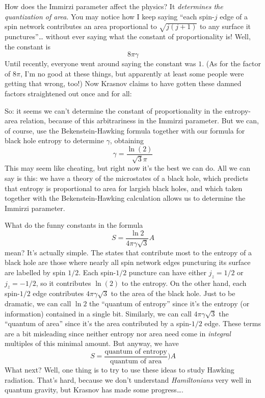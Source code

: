 \documentclass{article}
\def\tightlist{}
\renewcommand{\texttt}[1]{%
  \begingroup
  \ttfamily
  \begingroup\lccode`~=`/\lowercase{\endgroup\def~}{/\discretionary{}{}{}}%
  \begingroup\lccode`~=`[\lowercase{\endgroup\def~}{[\discretionary{}{}{}}%
  \begingroup\lccode`~=`.\lowercase{\endgroup\def~}{.\discretionary{}{}{}}%
  \catcode`/=\active\catcode`[=\active\catcode`.=\active
  \scantokens{#1\noexpand}%
  \endgroup
}
\begin{document}
How does the Immirzi parameter affect the physics? It \emph{determines
the quantization of area}. You may notice how I keep saying ``each
spin-\(j\) edge of a spin network contributes an area proportional to
\(\sqrt{j(j+1)}\) to any surface it punctures''\ldots{} without ever
saying what the constant of proportionality is! Well, the constant is
\[8 \pi \gamma\] Until recently, everyone went around saying the
constant was \(1\). (As for the factor of \(8\pi\), I'm no good at these
things, but apparently at least some people were getting that wrong,
too!) Now Krasnov claims to have gotten these damned factors
straightened out once and for all:


So: it seems we can't determine the constant of proportionality in the
entropy-area relation, because of this arbitrariness in the Immirzi
parameter. But we can, of course, use the Bekenstein-Hawking formula
together with our formula for black hole entropy to determine
\(\gamma\), obtaining \[\gamma = \frac{\ln(2)}{\sqrt{3}\pi}\] This may
seem like cheating, but right now it's the best we can do. All we can
say is this: we have a theory of the microstates of a black hole, which
predicts that entropy is proportional to area for largish black holes,
and which taken together with the Bekenstein-Hawking calculation allows
us to determine the Immirzi parameter.

What do the funny constants in the formula
\[S = \frac{\ln 2}{4\pi\gamma\sqrt{3}} A\] mean? It's actually simple.
The states that contribute most to the entropy of a black hole are those
where nearly all spin network edges puncturing its surface are labelled
by spin \(1/2\). Each spin-\(1/2\) puncture can have either
\(j_z = 1/2\) or \(j_z = -1/2\), so it contributes \(\ln(2)\) to the
entropy. On the other hand, each spin-\(1/2\) edge contributes
\(4\pi\gamma\sqrt{3}\) to the area of the black hole. Just to be
dramatic, we can call \(\ln 2\) the ``quantum of entropy'' since it's
the entropy (or information) contained in a single bit. Similarly, we
can call \(4\pi\gamma\sqrt{3}\) the ``quantum of area'' since it's the
area contributed by a spin-\(1/2\) edge. These terms are a bit
misleading since neither entropy nor area need come in \emph{integral}
multiples of this minimal amount. But anyway, we have
\[S = \frac{\text{quantum of entropy}}{\text{quantum of area}}) A\] What
next? Well, one thing is to try to use these ideas to study Hawking
radiation. That's hard, because we don't understand \emph{Hamiltonians}
very well in quantum gravity, but Krasnov has made some progress\ldots.
\end{document}
